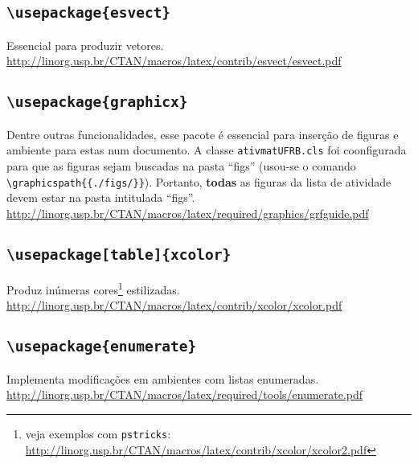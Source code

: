 \subsection*{\texttt{\textbackslash usepackage\{esvect\}}}
Essencial para produzir vetores.\\
{\small\url{http://linorg.usp.br/CTAN/macros/latex/contrib/esvect/esvect.pdf}}

\subsection*{\texttt{\textbackslash usepackage\{graphicx\}}}
Dentre outras funcionalidades, esse pacote é essencial para inserção de figuras
e ambiente para estas num documento.
A classe \texttt{ativmatUFRB.cls} foi coonfigurada para que as figuras sejam 
buscadas na pasta ``figs'' (usou-se o comando \verb|\graphicspath{{./figs/}}|).
Portanto, \textbf{todas} as figuras da lista de atividade devem estar na pasta
intitulada ``figs''.\\
{\small\url{http://linorg.usp.br/CTAN/macros/latex/required/graphics/grfguide.pdf}}

\subsection*{\texttt{\textbackslash usepackage[table]\{xcolor\}}}
Produz inúmeras cores\footnote{veja exemplos com \texttt{pstricks}:
\url{http://linorg.usp.br/CTAN/macros/latex/contrib/xcolor/xcolor2.pdf}}
estilizadas.\\ 
{\small\url{http://linorg.usp.br/CTAN/macros/latex/contrib/xcolor/xcolor.pdf}}

\subsection*{\texttt{\textbackslash usepackage\{enumerate\}}}
Implementa modificações em ambientes com listas enumeradas.\\
{\small\url{http://linorg.usp.br/CTAN/macros/latex/required/tools/enumerate.pdf}}

